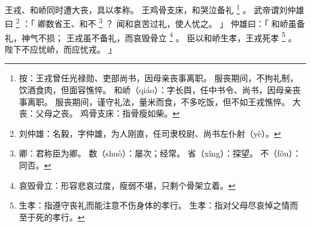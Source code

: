 
\switchcolumn*[\section{}]

王戎、和峤同时遭大丧，具以孝称。
王鸡骨支床，和哭泣备礼%
\footnote{%
    按：王戎曾任光禄勋、吏部尚书，因母亲丧事离职。
        服丧期间，不拘礼制，饮酒食肉，但面容憔悴。
    和峤（qiáo）：字长舆，任中书令、尚书，因母亲丧事离职。
                  服丧期间，谨守礼法，量米而食，不多吃饭，但不如王戎憔悴。
    大丧：父母之丧。
    鸡骨支床：指骨瘦如柴。
}%
。
武帝谓刘仲雄曰%
\footnote{%
    刘仲雄：名毅，字仲雄，为人刚直，任司隶校尉、尚书左仆射（yè）。
}%
：「
    卿数省王、和不%
    \footnote{%
        卿：君称臣为卿。
        数（shuò）：屡次；经常。
        省（xǐng）：探望。
        不（fǒu）：同否。
    }%
    ？
    闻和哀苦过礼，使人忧之。
」
仲雄曰：「
    和峤虽备礼，神气不损；
    王戎虽不备礼，而哀毁骨立%
    \footnote{%
        哀毁骨立：形容悲哀过度，瘦弱不堪，只剩个骨架立着。
    }%
    。
    臣以和峤生孝，王戎死孝%
    \footnote{%
        生孝：指遵守丧礼而能注意不伤身体的孝行。
        生孝：指对父母尽哀悼之情而至于死的孝行。
    }%
    。
    陛下不应忧峤，而应忧戎。
」

\switchcolumn


